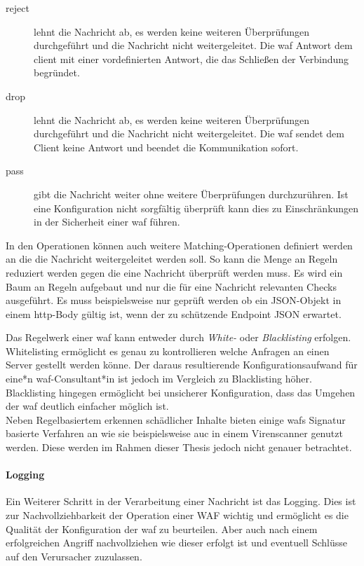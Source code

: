 \begin{description}
    \item[reject] lehnt die Nachricht ab, es werden keine weiteren Überprüfungen durchgeführt und die Nachricht nicht weitergeleitet.
    Die \ac{waf} Antwort dem client mit einer vordefinierten Antwort, die das Schließen der Verbindung begründet.
    \item[drop] lehnt die Nachricht ab, es werden keine weiteren Überprüfungen durchgeführt und die Nachricht nicht weitergeleitet.
    Die \ac{waf} sendet dem Client keine Antwort und beendet die Kommunikation sofort.
    \item[pass] gibt die Nachricht weiter ohne weitere Überprüfungen durchzurühren.
    Ist eine Konfiguration nicht sorgfältig überprüft kann dies zu Einschränkungen in der Sicherheit einer \ac{waf} führen.
\end{description}

In den Operationen können auch weitere Matching-Operationen definiert werden an die die Nachricht weitergeleitet werden soll.
So kann die Menge an Regeln reduziert werden gegen die eine Nachricht überprüft werden muss.
Es wird ein Baum an Regeln aufgebaut und nur die für eine Nachricht relevanten Checks ausgeführt.
Es muss beispielsweise nur geprüft werden ob ein JSON-Objekt in einem \ac{http}-Body gültig ist, wenn der zu schützende Endpoint JSON erwartet.

Das Regelwerk einer \ac{waf} kann entweder durch \textit{White-} oder \textit{Blacklisting} erfolgen.
Whitelisting ermöglicht es genau zu kontrollieren welche Anfragen an einen Server gestellt werden könne.
Der daraus resultierende Konfigurationsaufwand für eine*n \ac{waf}-Consultant*in ist jedoch im Vergleich zu Blacklisting höher.
Blacklisting hingegen ermöglicht bei unsicherer Konfiguration, dass das Umgehen der \ac{waf} deutlich einfacher möglich ist.\\

Neben Regelbasiertem erkennen schädlicher Inhalte bieten einige \acp{waf} Signatur basierte Verfahren an wie sie beispielsweise auc in einem Virenscanner genutzt werden.
Diese werden im Rahmen dieser Thesis jedoch nicht genauer betrachtet.

\paragraph{Logging}
Ein Weiterer Schritt in der Verarbeitung einer Nachricht ist das Logging.
Dies ist zur Nachvollziehbarkeit der Operation einer WAF wichtig und ermöglicht es die Qualität der Konfiguration der \ac{waf} zu beurteilen.
Aber auch nach einem erfolgreichen Angriff nachvollziehen wie dieser erfolgt ist und eventuell Schlüsse auf den Verursacher zuzulassen.

